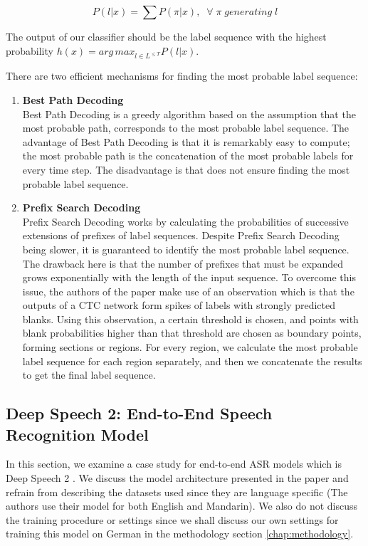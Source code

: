 \begin{equation}
\label{eq:22}
P(l|x) = \sum P(\pi|x), \; \;  \forall \; \pi \; generating \; l
\end{equation}


The output of our classifier should be the label sequence with the highest probability $h(x) = {arg \, max}_{l \in {L^{\leq T}}} P(l|x)$.

There are two efficient mechanisms for finding the most probable label sequence:
\begin{enumerate}
	\item \textbf{Best Path Decoding} \mbox{}\\
	 Best Path Decoding is a greedy algorithm based on the assumption that the most probable path, corresponds to the most probable label sequence. The advantage of Best Path Decoding is that it is remarkably easy to compute; the most probable path is the concatenation of the most probable labels for every time step. The disadvantage is that does not ensure finding the most probable label sequence.
	\item \textbf{Prefix Search Decoding} \mbox{}\\
	Prefix Search Decoding works by calculating the probabilities of successive extensions of prefixes of label sequences. Despite Prefix Search Decoding being slower, it is guaranteed to identify the most probable label sequence. The drawback here is that the number of prefixes that must be expanded grows exponentially with the length of the input sequence. To overcome this issue, the authors of the paper make use of an observation which is that the outputs of a \ac{CTC} network form spikes of labels with strongly predicted blanks. Using this observation, a certain threshold is chosen, and points with blank probabilities higher than that threshold are chosen as boundary points, forming sections or regions. For every region, we calculate the most probable label sequence for each region separately, and then we concatenate the results to get the final label sequence. 
\end{enumerate} 


\subsection{Deep Speech 2: End-to-End Speech Recognition Model} 
\label{bg:sub8}

In this section, we examine a case study for end-to-end \ac{ASR} models which is Deep Speech 2 \cite{amodei2016deep}. We discuss the model architecture presented in the paper and refrain from describing the datasets used since they are language specific (The authors use their model for both English and Mandarin). We also do not discuss the training procedure or settings since we shall discuss our own settings for training this model on German in the methodology section \ref{chap:methodology}.

